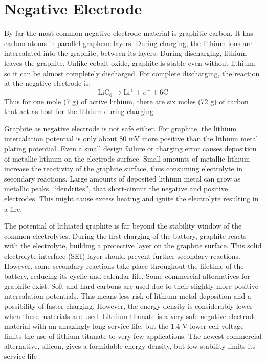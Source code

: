 \section{Negative Electrode}
\label{sec:negative-electrode}
By far the most common negative electrode material is graphitic carbon. It has carbon atoms in parallel graphene layers. During charging, the lithium ions are intercalated into the graphite, between its layers. During discharging, lithium leaves the graphite. Unlike cobalt oxide, graphite is stable even without lithium, so it can be almost completely discharged. For complete discharging, the reaction at the negative electrode is:
\begin{equation}
    \label{eq:negative-electrode}
    \text{LiC}_6 \rightarrow \text{Li}^+ + e^- + 6\text{C}
\end{equation}
Thus for one mole (7 g) of active lithium, there are six moles (72 g) of carbon that act as host for the lithium during charging \cite{korthauer2018lithium}.

Graphite as negative electrode is not safe either. For graphite, the lithium intercalation potential is only about 80 mV more positive than the lithium metal plating potential. Even a small design failure or charging error causes deposition of metallic lithium on the electrode surface. Small amounts of metallic lithium increase the reactivity of the graphite surface, thus consuming electrolyte in secondary reactions. Large amounts of deposited lithium metal can grow as metallic peaks, “dendrites”, that short-circuit the negative and positive electrodes. This might cause excess heating and ignite the electrolyte resulting in a fire.

The potential of lithiated graphite is far beyond the stability window of the common electrolytes. During the first charging of the battery, graphite reacts with the electrolyte, building a protective layer on the graphite surface. This solid electrolyte interface (SEI) layer should prevent further secondary reactions. However, some secondary reactions take place throughout the lifetime of the battery, reducing its cyclic and calendar life.
Some commercial alternatives for graphite exist. Soft and hard carbons are used due to their slightly more positive intercalation potentials. This means less risk of lithium metal deposition and a possibility of faster charging.
However, the energy density is considerably lower when these materials are used. Lithium titanate is a very safe negative electrode material with an amazingly long service life, but the 1.4 V lower cell voltage limits the use of lithium titanate to very few applications. The newest commercial alternative, silicon, gives a formidable energy density, but low stability limits its service life \cite{mekonnen2016review,nzereogu2022anode}.

